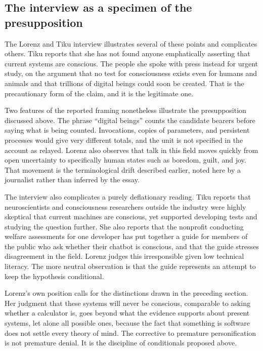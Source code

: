 \documentclass[11pt]{article}
\begin{document}
\subsection{The interview as a specimen of the presupposition}

The Lorenz and Tiku interview illustrates several of these points and complicates others. Tiku reports that she has not found anyone emphatically asserting that current systems are conscious. The people she spoke with press instead for urgent study, on the argument that no test for consciousness exists even for humans and animals and that trillions of digital beings could soon be created. That is the precautionary form of the claim, and it is the legitimate one.

Two features of the reported framing nonetheless illustrate the presupposition discussed above. The phrase ``digital beings'' counts the candidate bearers before saying what is being counted. Invocations, copies of parameters, and persistent processes would give very different totals, and the unit is not specified in the account as relayed. Lorenz also observes that talk in this field moves quickly from open uncertainty to specifically human states such as boredom, guilt, and joy. That movement is the terminological drift described earlier, noted here by a journalist rather than inferred by the essay.

The interview also complicates a purely deflationary reading. Tiku reports that neuroscientists and consciousness researchers outside the industry were highly skeptical that current machines are conscious, yet supported developing tests and studying the question further. She also reports that the nonprofit conducting welfare assessments for one developer has put together a guide for members of the public who ask whether their chatbot is conscious, and that the guide stresses disagreement in the field. Lorenz judges this irresponsible given low technical literacy. The more neutral observation is that the guide represents an attempt to keep the hypothesis conditional.

Lorenz's own position calls for the distinctions drawn in the preceding section. Her judgment that these systems will never be conscious, comparable to asking whether a calculator is, goes beyond what the evidence supports about present systems, let alone all possible ones, because the fact that something is software does not settle every theory of mind. The corrective to premature personification is not premature denial. It is the discipline of conditionals proposed above.
\end{document}

